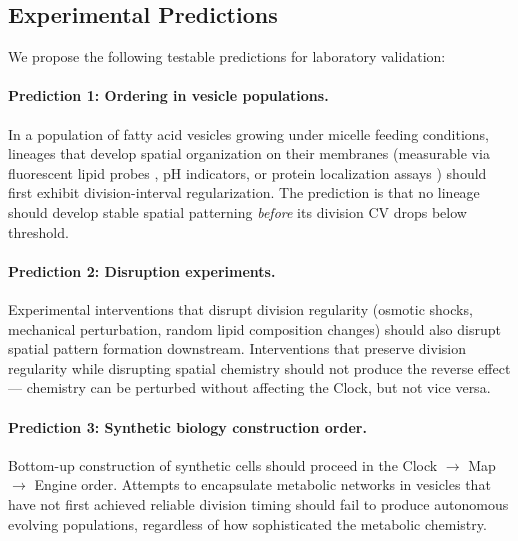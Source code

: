 \documentclass[11pt,letterpaper]{article}
\begin{document}
\subsection{Experimental Predictions}

We propose the following testable predictions for laboratory validation:

\paragraph{Prediction 1: Ordering in vesicle populations.} In a population of fatty acid vesicles growing under micelle feeding conditions, lineages that develop spatial organization on their membranes (measurable via fluorescent lipid probes \citep{dealmeida2003sphingomyelin}, pH indicators, or protein localization assays \citep{kurihara2011self}) should first exhibit division-interval regularization. The prediction is that no lineage should develop stable spatial patterning \emph{before} its division CV drops below threshold.

\paragraph{Prediction 2: Disruption experiments.} Experimental interventions that disrupt division regularity (osmotic shocks, mechanical perturbation, random lipid composition changes) should also disrupt spatial pattern formation downstream. Interventions that preserve division regularity while disrupting spatial chemistry should not produce the reverse effect --- chemistry can be perturbed without affecting the Clock, but not vice versa.

\paragraph{Prediction 3: Synthetic biology construction order.} Bottom-up construction of synthetic cells should proceed in the Clock $\to$ Map $\to$ Engine order. Attempts to encapsulate metabolic networks in vesicles that have not first achieved reliable division timing should fail to produce autonomous evolving populations, regardless of how sophisticated the metabolic chemistry.
\end{document}
